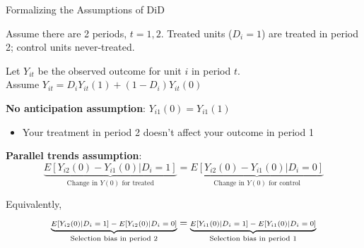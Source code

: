 \documentclass[11pt,english,handout]{beamer}
\newenvironment{wideitemize}{\itemize\addtolength{\itemsep}{10pt}}{\enditemize}
\begin{document}
\begin{frame}{Formalizing the Assumptions of DiD}
\begin{wideitemize}
	\item
	Assume there are 2 periods, $t = 1,2$.  Treated units ($D_i=1$) are treated in period 2; control units never-treated.
	
	\item
	Let $Y_{it}$ be the observed outcome for unit $i$ in period $t$. \\ 
	Assume $Y_{it} = D_{i} Y_{it}(1) + (1-D_i)Y_{it}(0)$
	
	\pause
	\item
	\textbf{No anticipation assumption}: $Y_{i1}(0) = Y_{i1}(1)$
		\begin{itemize}
			\item 
			Your treatment in period 2 doesn't affect your outcome in period 1
		\end{itemize}	
	\item
	\textbf{Parallel trends assumption}:
	$$ \underbrace{E[  Y_{i2}(0) - Y_{i1}(0) | D_i = 1 ] }_{\text{Change in $Y(0)$ for treated}} = \underbrace{E[  Y_{i2}(0) - Y_{i1}(0) | D_i = 0 ] }_{\text{Change in $Y(0)$ for control}} $$
	
	\pause
	Equivalently,
	$$\scriptsize \underbrace{E[  Y_{i2}(0) | D_i = 1 ] - E[Y_{i2}(0) | D_i =0] }_{\text{Selection bias in period 2}} = \underbrace{E[  Y_{i1}(0) | D_i = 1 ] - E[Y_{i1}(0) | D_i =0] }_{\text{Selection bias in period 1}} $$
\end{wideitemize}	
\end{frame}
\end{document}

